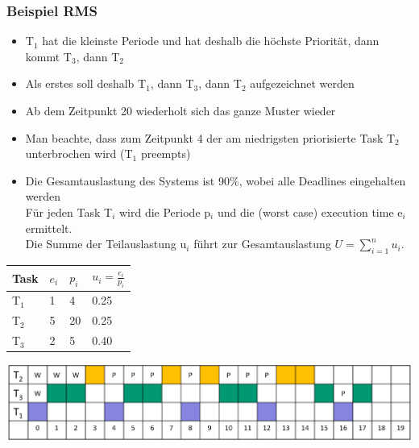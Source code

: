 \subsubsection{Beispiel RMS}
\begin{itemize}[noitemsep,topsep=0pt]
  \item T$_1$ hat die kleinste Periode und hat deshalb die höchste Priorität, dann kommt T$_3$, dann T$_2$
  \item Als erstes soll deshalb T$_1$, dann T$_3$, dann T$_2$ aufgezeichnet werden
  \item Ab dem Zeitpunkt 20 wiederholt sich das ganze Muster wieder
  \item Man beachte, dass zum Zeitpunkt 4 der am niedrigsten priorisierte Task T$_2$ unterbrochen wird (T$_1$ preempts)
  \item Die Gesamtauslastung des Systems ist 90\%, wobei alle Deadlines eingehalten werden\\Für jeden Task T$_i$ wird die Periode p$_i$ und die (worst case) execution time e$_i$ ermittelt.\\Die Summe der Teilauslastung u$_i$ führt zur Gesamtauslastung $U=\sum_{i = 1}^{n}   u_i$.
\end{itemize}
\begin{minipage}[t]{0.3\linewidth}
  \begin{tabular}{| l | l | l | l |}
    \hline
    Task  & $e_i$ & $p_i$ & $u_i=\frac{e_i}{p_i}$ \\
    \hline
    T$_1$ & 1     & 4     & 0.25                  \\
    \hline
    T$_2$ & 5     & 20    & 0.25                  \\
    \hline
    T$_3$ & 2     & 5     & 0.40                  \\
    \hline
  \end{tabular}
\end{minipage}
\begin{minipage}[c]{0.7\linewidth}
  \includegraphics[width=\linewidth]{images/Schedule/RMS}
\end{minipage}
